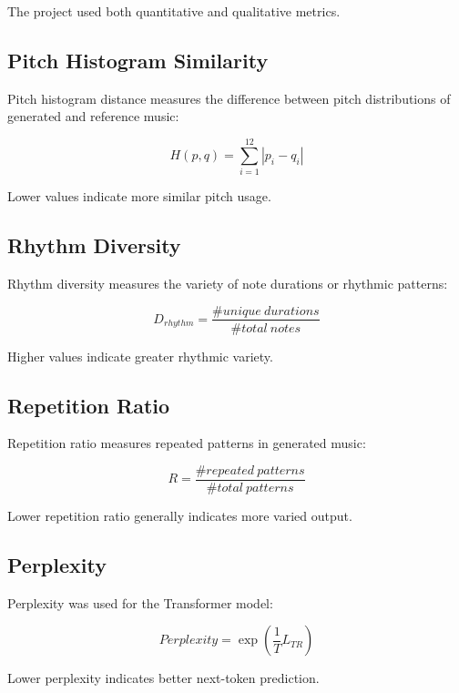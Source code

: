 \documentclass[conference]{IEEEtran}
\begin{document}
The project used both quantitative and qualitative metrics.

\subsection{Pitch Histogram Similarity}

Pitch histogram distance measures the difference between pitch distributions of generated and reference music:

\begin{equation}
H(p,q) = \sum_{i=1}^{12}|p_i - q_i|
\end{equation}

Lower values indicate more similar pitch usage.

\subsection{Rhythm Diversity}

Rhythm diversity measures the variety of note durations or rhythmic patterns:

\begin{equation}
D_{rhythm} = \frac{\#unique\ durations}{\#total\ notes}
\end{equation}

Higher values indicate greater rhythmic variety.

\subsection{Repetition Ratio}

Repetition ratio measures repeated patterns in generated music:

\begin{equation}
R = \frac{\#repeated\ patterns}{\#total\ patterns}
\end{equation}

Lower repetition ratio generally indicates more varied output.

\subsection{Perplexity}

Perplexity was used for the Transformer model:

\begin{equation}
Perplexity = \exp\left(\frac{1}{T}L_{TR}\right)
\end{equation}

Lower perplexity indicates better next-token prediction.
\end{document}
